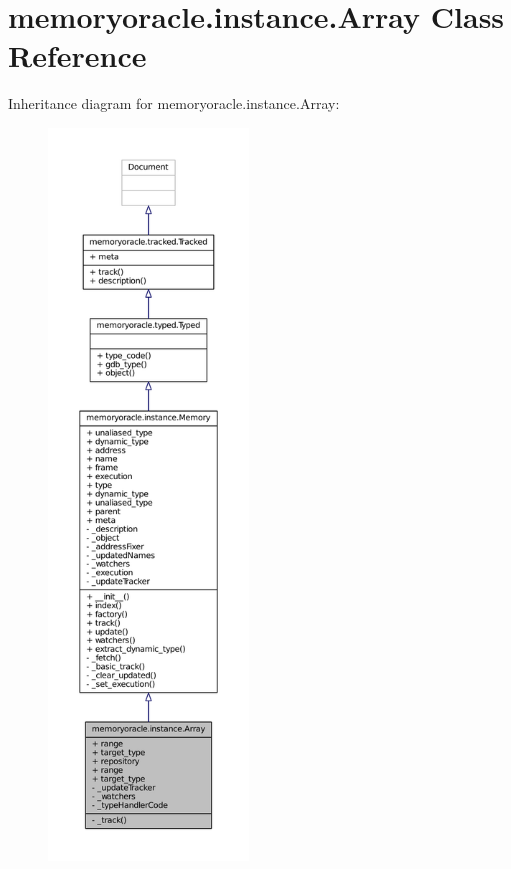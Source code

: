 \hypertarget{classmemoryoracle_1_1instance_1_1Array}{}\section{memoryoracle.\+instance.\+Array Class Reference}
\label{classmemoryoracle_1_1instance_1_1Array}


Inheritance diagram for memoryoracle.\+instance.\+Array\+:
\nopagebreak
\begin{figure}[H]
\begin{center}
\leavevmode
\includegraphics[height=550pt]{classmemoryoracle_1_1instance_1_1Array__inherit__graph}
\end{center}
\end{figure}



